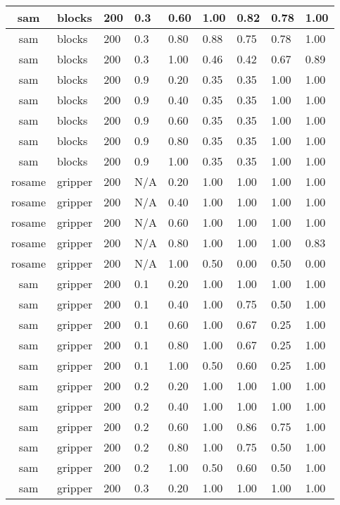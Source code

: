 \begin{table}[ht]
\begin{tabular}{c}
sam & blocks & 200 & 0.3 & 0.60 & 1.00 & 0.82 & 0.78 & 1.00 \\ \hline
sam & blocks & 200 & 0.3 & 0.80 & 0.88 & 0.75 & 0.78 & 1.00 \\ \hline
sam & blocks & 200 & 0.3 & 1.00 & 0.46 & 0.42 & 0.67 & 0.89 \\ \hline
sam & blocks & 200 & 0.9 & 0.20 & 0.35 & 0.35 & 1.00 & 1.00 \\ \hline
sam & blocks & 200 & 0.9 & 0.40 & 0.35 & 0.35 & 1.00 & 1.00 \\ \hline
sam & blocks & 200 & 0.9 & 0.60 & 0.35 & 0.35 & 1.00 & 1.00 \\ \hline
sam & blocks & 200 & 0.9 & 0.80 & 0.35 & 0.35 & 1.00 & 1.00 \\ \hline
sam & blocks & 200 & 0.9 & 1.00 & 0.35 & 0.35 & 1.00 & 1.00 \\ \hline
rosame & gripper & 200 & N/A & 0.20 & 1.00 & 1.00 & 1.00 & 1.00 \\ \hline
rosame & gripper & 200 & N/A & 0.40 & 1.00 & 1.00 & 1.00 & 1.00 \\ \hline
rosame & gripper & 200 & N/A & 0.60 & 1.00 & 1.00 & 1.00 & 1.00 \\ \hline
rosame & gripper & 200 & N/A & 0.80 & 1.00 & 1.00 & 1.00 & 0.83 \\ \hline
rosame & gripper & 200 & N/A & 1.00 & 0.50 & 0.00 & 0.50 & 0.00 \\ \hline
sam & gripper & 200 & 0.1 & 0.20 & 1.00 & 1.00 & 1.00 & 1.00 \\ \hline
sam & gripper & 200 & 0.1 & 0.40 & 1.00 & 0.75 & 0.50 & 1.00 \\ \hline
sam & gripper & 200 & 0.1 & 0.60 & 1.00 & 0.67 & 0.25 & 1.00 \\ \hline
sam & gripper & 200 & 0.1 & 0.80 & 1.00 & 0.67 & 0.25 & 1.00 \\ \hline
sam & gripper & 200 & 0.1 & 1.00 & 0.50 & 0.60 & 0.25 & 1.00 \\ \hline
sam & gripper & 200 & 0.2 & 0.20 & 1.00 & 1.00 & 1.00 & 1.00 \\ \hline
sam & gripper & 200 & 0.2 & 0.40 & 1.00 & 1.00 & 1.00 & 1.00 \\ \hline
sam & gripper & 200 & 0.2 & 0.60 & 1.00 & 0.86 & 0.75 & 1.00 \\ \hline
sam & gripper & 200 & 0.2 & 0.80 & 1.00 & 0.75 & 0.50 & 1.00 \\ \hline
sam & gripper & 200 & 0.2 & 1.00 & 0.50 & 0.60 & 0.50 & 1.00 \\ \hline
sam & gripper & 200 & 0.3 & 0.20 & 1.00 & 1.00 & 1.00 & 1.00 \\ \hline

\end{tabular}
\end{table}
